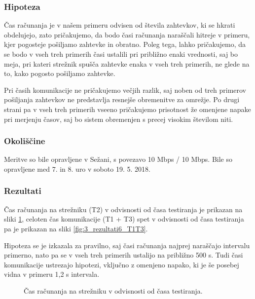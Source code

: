 \subsubsection{Hipoteza}

Čas računanja je v našem primeru odvisen od števila zahtevkov, ki se hkrati obdelujejo, zato pričakujemo, da bodo časi računanja naraščali hitreje v primeru, kjer pogosteje pošiljamo zahtevke in obratno.
Poleg tega, lahko pričakujemo, da se bodo v vseh treh primerih časi ustalili pri približno enaki vrednosti, saj bo meja, pri kateri strežnik spušča zahtevke enaka v vseh treh primerih, ne glede na to, kako pogosto pošiljamo zahtevke.

Pri časih komunikacije ne pričakujemo večjih razlik, saj noben od treh primerov pošiljanja zahtevkov ne predstavlja resnejše obremenitve za omrežje. Po drugi strani pa v vseh treh primerih vseeno pričakujemo prisotnost že omenjene napake pri merjenju časov, saj bo sistem obremenjen s precej visokim številom niti.

\subsubsection{Okoliščine}

Meritve so bile opravljene v Sežani, s povezavo 10 Mbps / 10 Mbps.
Bile so opravljene med 7. in 8. uro v soboto 19. 5. 2018.

\subsubsection{Rezultati}

Čas računanja na strežniku (T2) v odvisnosti od časa testiranja je prikazan na sliki \ref{fig:3_rezultati6_T2}, celoten čas komunikacije (T1 + T3) spet v odvisnosti od časa testiranja pa je prikazan na sliki \ref{fig:3_rezultati6_T1T3}.

Hipoteza se je izkazala za pravilno, saj časi računanja najprej naraščajo intervalu primerno, nato pa se v vseh treh primerih ustalijo na približno 500 s.
Tudi časi komunikacije ustrezajo hipotezi, vključno z omenjeno napako, ki je še posebej vidna v primeru 1,2 s intervala.

\begin{figure}[H]
    \caption{Čas računanja na strežniku v odvisnosti od časa testiranja.}
    \label{fig:3_rezultati6_T2}
\end{figure}

